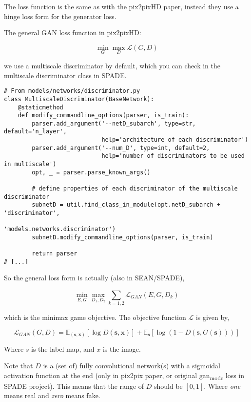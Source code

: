 \documentclass{memoir}
\begin{document}
The loss function is the same as with the pix2pixHD paper, instead they use a
hinge loss form for the generator loss.

The general GAN loss function in pix2pixHD:

\[
\min_{G} \max_{D} \mathcal{L}(G, D)
\]

we use a multiscale discriminator by default, which you can check in the
multiscale discriminator class in SPADE.

\begin{verbatim}
# From models/networks/discriminator.py
class MultiscaleDiscriminator(BaseNetwork):
    @staticmethod
    def modify_commandline_options(parser, is_train):
        parser.add_argument('--netD_subarch', type=str, default='n_layer',
                            help='architecture of each discriminator')
        parser.add_argument('--num_D', type=int, default=2,
                            help='number of discriminators to be used in multiscale')
        opt, _ = parser.parse_known_args()

        # define properties of each discriminator of the multiscale discriminator
        subnetD = util.find_class_in_module(opt.netD_subarch + 'discriminator',
                                            'models.networks.discriminator')
        subnetD.modify_commandline_options(parser, is_train)

        return parser
# [...]
\end{verbatim}

So the general loss form is actually (also in SEAN/SPADE),

\[
\min_{E,G} \max_{D_1 , D_2} \sum_{k=1,2}^{} \mathcal{ L }_{GAN}(E,G, D_{k})
\]

which is the minimax game objective. The objective function \(\mathcal{L}\) is given by,

\[
\mathcal{L}_{GAN}(G,D) = \mathbb{E}_{\left( \boldsymbol{s,x}\right)} \left[ \log D(\boldsymbol{s,x}) \right] + \mathbb{E}_{\boldsymbol{s}} \left[ \log(1 - D(\boldsymbol{s} , G(\boldsymbol{s}))) \right]
\]

Where \(s\) is the label map, and \(x\) is the image.

Note that \(D\) is a (set of) fully convolutional network(s) with a sigmoidal activation
function at the end (only in pix2pix paper, or original gan\textsubscript{mode} loss in SPADE
project). This means that the range of \(D\) should be \(\left[ 0,1\right]\).
Where \emph{one} means real and \emph{zero} means fake.
\end{document}
